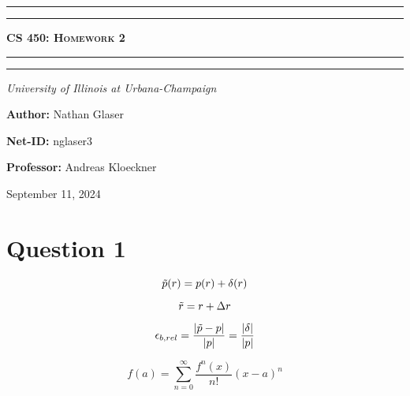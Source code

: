 \documentclass{article}
\begin{document}
\begin{titlepage}

\centering
\scshape
\vspace{\baselineskip}

%
\rule{\textwidth}{1.6pt}\vspace*{-\baselineskip}\vspace*{2pt}
\rule{\textwidth}{0.4pt}

{\Huge \textbf{\textsc{CS 450: Homework 2 \\
\vspace{15pt}}}}

\rule{\textwidth}{0.4pt}\vspace*{-\baselineskip}\vspace{3.2pt}
\rule{\textwidth}{1.6pt}\vspace{6pt}
\centerline{\textit{University of Illinois at Urbana-Champaign}} 
\vspace{1.5\baselineskip}


\large \centerline{\textbf{Author:} Nathan Glaser}
\large \centerline{\textbf{Net-ID:} nglaser3}
\quad

\large \centerline{\textbf{Professor:} Andreas Kloeckner}
\quad

\vfill
\large \centerline{September 11, 2024}
%
\end{titlepage}

\tableofcontents
\newpage
{}

\section*{Question 1}

\begin{equation}
    \Tilde{p}(r) = p(r) + \delta(r)
    \label{ptil_def}
\end{equation}

\begin{equation}
    \label{rdef}
    \Tilde{r} = r + \Delta r
\end{equation}

\begin{equation}
    \epsilon_{b,rel} = \frac{\left| \Tilde{p}-p \right|}{|p|} = \frac{\left| \delta \right|}{|p|}
    \label{brel_def}
\end{equation}

\begin{equation}
    \label{taydef}
    f(a) = \sum_{n=0}^\infty \frac{f^n(x)}{n!} (x-a)^n
\end{equation}
\end{document}
